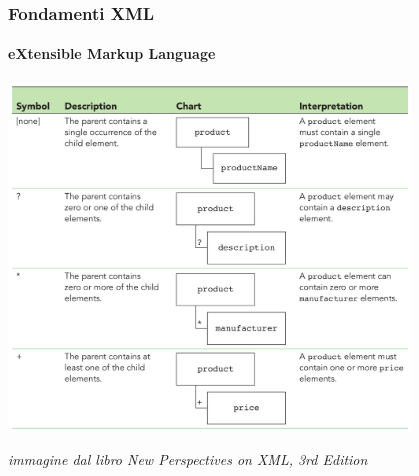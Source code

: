 

\begin{frame}
	\frametitle{Fondamenti XML}
	\framesubtitle{eXtensible Markup Language}
	\addtocounter{nframe}{1}

	\begin{center}

		\includegraphics[width=0.8\textwidth]{imgs/xml-parent-child-quantifier.png}
    \end{center}
    
\begin{tiny}\textit{immagine dal libro New Perspectives on XML, 3rd Edition}\end{tiny}

\end{frame}

